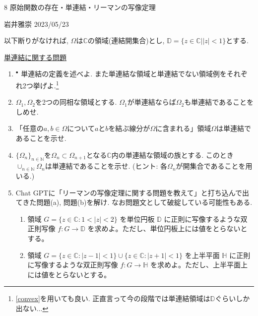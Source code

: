 \documentclass[dvipdfmx,a4paper,11pt]{article}
\newcommand{\N}{\mathbb{N}}
\newcommand{\C}{\mathbb{C}}
\newcommand{\D}{\mathbb{D}}
\theoremstyle{definition}
\begin{document}

\begin{center}
{\Large 8 原始関数の存在・単連結・リーマンの写像定理}
\end{center}

\begin{flushright}
 岩井雅崇 2023/05/23
\end{flushright}
以下断りがなければ, $\Omega$は$\C$の領域(連結開集合)とし, $\D=\{z \in \C |  |z| <1\}$とする. 

\vspace{12pt}
\hspace{-24pt}\underline{単連結に関する問題}
\begin{enumerate}[label=\textbf{問}8.\arabic*]

\item $^{\bullet}$ 単連結の定義を述べよ. また単連結な領域と単連結でない領域例をそれぞれ2つ挙げよ.\footnote{\ref{convex}を用いても良い. 正直言って今の段階では単連結領域は$\D$ぐらいしか出ない...}

\item $\Omega_{1}, \Omega_{2}$を2つの同相な領域とする. $\Omega_{1}$が単連結ならば$\Omega_2$も単連結であることをしめせ.

\item \label{convex} 「任意の$a, b \in \Omega$について$a$と$b$を結ぶ線分が$\Omega$に含まれる」領域$\Omega$は単連結であることを示せ. 

\item $\{ \Omega_{n} \}_{n \in \N}$を$\Omega_n \subset \Omega_{n+1}$となる$\C$内の単連結な領域の族とする. このとき$\cup_{n \in \N}\Omega_{n}$は単連結であることを示せ. (ヒント: 各$\Omega_n$が開集合であることを用いる.)

    
    \item Chat GPTに「リーマンの写像定理に関する問題を教えて」と打ち込んで出てきた問題(a), 問題(b)を解け. なお問題文として破綻している可能性もある.
    \vspace{-8pt}
       \begin{enumerate}
\setlength{\parskip}{0cm} 
  \setlength{\itemsep}{0cm} 
  \item 領域 $G=\{z\in \mathbb{C}: 1<|z|<2\}$ を単位円板 $\mathbb{D}$ に正則に写像するような双正則写像 $f:G\to \mathbb{D}$ を求めよ。ただし、単位円板上には値をとらないとする。
  \item 領域 $G=\{z\in \mathbb{C}: |z-1|<1\}\cup \{z\in \mathbb{C}: |z+1|<1\}$ を上半平面 $\mathbb{H}$ に正則に写像するような双正則写像 $f:G\to \mathbb{H}$ を求めよ。ただし、上半平面上には値をとらないとする。
      \end{enumerate} 


\end{enumerate}
\end{document}
